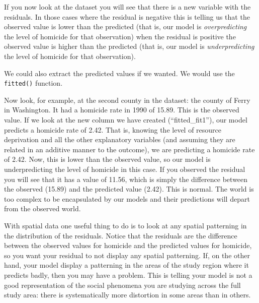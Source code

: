\documentclass[
  krantz2]{krantz}
\makeatletter
\newenvironment{Shaded}{\begin{snugshade}}{\end{snugshade}}
\newcommand{\FunctionTok}[1]{\textcolor[rgb]{0,0,0}{#1}}
\newcommand{\NormalTok}[1]{#1}
\newcommand{\OtherTok}[1]{\textcolor[rgb]{0.37,0.37,0.37}{#1}}
\newcommand{\SpecialCharTok}[1]{\textcolor[rgb]{0,0,0}{#1}}
\newenvironment{kframe}{%
\medskip{}
\setlength{\fboxsep}{.8em}
 \def\at@end@of@kframe{}%
 \ifinner\ifhmode%
  \def\at@end@of@kframe{\end{minipage}}%
  \begin{minipage}{\columnwidth}%
 \fi\fi%
 \def\FrameCommand##1{\hskip\@totalleftmargin \hskip-\fboxsep
 \colorbox{shadecolor}{##1}\hskip-\fboxsep
     \hskip-\linewidth \hskip-\@totalleftmargin \hskip\columnwidth}%
 \MakeFramed {\advance\hsize-\width
   \@totalleftmargin\z@ \linewidth\hsize
   \@setminipage}}%
 {\par\unskip\endMakeFramed%
 \at@end@of@kframe}
\renewenvironment{Shaded}{\begin{kframe}}{\end{kframe}}
\makeatother
\begin{document}
\begin{Shaded}
\end{Shaded}

If you now look at the dataset you will see that there is a new variable with the residuals. In those cases where the residual is negative this is telling us that the observed value is lower than the predicted (that is, our model is \emph{overpredicting} the level of homicide for that observation) when the residual is positive the observed value is higher than the predicted (that is, our model is \emph{underpredicting} the level of homicide for that observation).

We could also extract the predicted values if we wanted. We would use the \texttt{fitted()} function.

\begin{Shaded}
\end{Shaded}

Now look, for example, at the second county in the dataset: the county of Ferry in Washington. It had a homicide rate in 1990 of 15.89. This is the observed value. If we look at the new column we have created (``fitted\_fit1''), our model predicts a homicide rate of 2.42. That is, knowing the level of resource deprivation and all the other explanatory variables (and assuming they are related in an additive manner to the outcome), we are predicting a homicide rate of 2.42. Now, this is lower than the observed value, so our model is underpredicting the level of homicide in this case. If you observed the residual you will see that it has a value of 11.56, which is simply the difference between the observed (15.89) and the predicted value (2.42). This is normal. The world is too complex to be encapsulated by our models and their predictions will depart from the observed world.

With spatial data one useful thing to do is to look at any spatial patterning in the distribution of the residuals. Notice that the residuals are the difference between the observed values for homicide and the predicted values for homicide, so you want your residual to not display any spatial patterning. If, on the other hand, your model display a patterning in the areas of the study region where it predicts badly, then you may have a problem. This is telling your model is not a good representation of the social phenomena you are studying across the full study area: there is systematically more distortion in some areas than in others.
\end{document}
